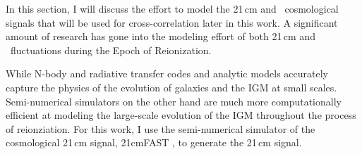 In this section, I will discuss the effort to model the 21\,cm and \lya\
cosmological signals that will be used for cross-correlation later in this work.
A significant amount of research has gone into the modeling effort of both 21\,cm and
\lya\ fluctuations during the Epoch of Reionization.

While N-body and radiative transfer codes and analytic models accurately capture
the physics of the evolution of galaxies and the IGM at small scales. Semi-numerical
simulators on the other hand are much more computationally efficient at
modeling the large-scale evolution of the IGM throughout the process of reionziation.
For this work, I use the semi-numerical simulator of the cosmological 21\,cm signal,
21cmFAST \cite{2011MNRAS.411..955M}, to generate the 21\,cm signal.
